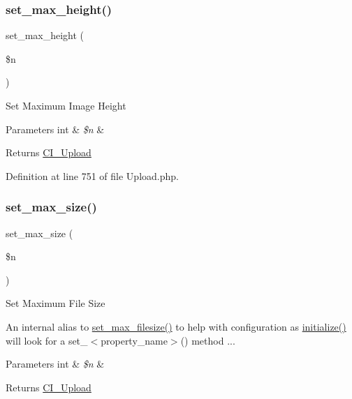 \subsubsection{\texorpdfstring{set\_max\_height()}{set\_max\_height()}}
{\footnotesize\ttfamily set\+\_\+max\+\_\+height (\begin{DoxyParamCaption}\item[{}]{\$n }\end{DoxyParamCaption})}

Set Maximum Image Height


\begin{DoxyParams}[1]{Parameters}
int & {\em \$n} & \\
\hline
\end{DoxyParams}
\begin{DoxyReturn}{Returns}
\mbox{\hyperlink{class_c_i___upload}{C\+I\+\_\+\+Upload}} 
\end{DoxyReturn}


Definition at line 751 of file Upload.\+php.

\mbox{\label{class_c_i___upload_ac6e7445ece6780c730e910d978dde95e}} 
\subsubsection{\texorpdfstring{set\_max\_size()}{set\_max\_size()}}
{\footnotesize\ttfamily set\+\_\+max\+\_\+size (\begin{DoxyParamCaption}\item[{}]{\$n }\end{DoxyParamCaption})\hspace{0.3cm}{\ttfamily [protected]}}

Set Maximum File Size

An internal alias to \mbox{\hyperlink{class_c_i___upload_a1f78c3a54f32d313294b27cde4eafaf4}{set\+\_\+max\+\_\+filesize()}} to help with configuration as \mbox{\hyperlink{class_c_i___upload_a58cef448bae0c178f3f675700b7e4413}{initialize()}} will look for a set\+\_\+$<$property\+\_\+name$>$() method ...


\begin{DoxyParams}[1]{Parameters}
int & {\em \$n} & \\
\hline
\end{DoxyParams}
\begin{DoxyReturn}{Returns}
\mbox{\hyperlink{class_c_i___upload}{C\+I\+\_\+\+Upload}} 
\end{DoxyReturn}


